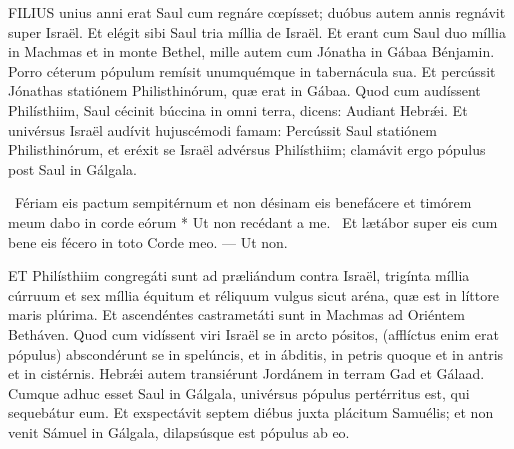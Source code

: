 




\lettrine[lines=2]{F}{ILIUS} unius anni erat Saul cum regnáre cœpísset; duóbus autem annis regnávit super Israël. Et elégit sibi Saul tria míllia de Israël. Et erant cum Saul duo míllia in Machmas et in monte Bethel, mille autem cum Jónatha in Gábaa Bénjamin. Porro céterum pópulum remísit unumquémque in tabernácula sua. Et percússit Jónathas statiónem Philisthinórum, quæ erat in Gábaa. Quod cum audíssent Philísthiim, Saul cécinit búccina in omni terra, dicens: Audiant Hebrǽi. Et univérsus Israël audívit hujuscémodi famam: Percússit Saul statiónem Philisthinórum, et eréxit se Israël advérsus Philísthiim; clamávit ergo pópulus post Saul in Gálgala.

\R\ Fériam eis pactum sempitérnum et non désinam eis benefácere et timórem meum dabo in corde eórum * Ut non recédant a me. \V\ Et lætábor super eis cum bene eis fécero in toto Corde meo. --- Ut non.


\lettrine[lines=2]{E}{T} Philísthiim congregáti sunt ad præliándum contra Israël, trigínta míllia cúrruum et sex míllia équitum et réliquum vulgus sicut aréna, quæ est in líttore maris plúrima. Et ascendéntes castrametáti sunt in Machmas ad Oriéntem Betháven. Quod cum vidíssent viri Israël se in arcto pósitos, (afflíctus enim erat pópulus) abscondérunt se in spelúncis, et in ábditis, in petris quoque et in antris et in cistérnis. Hebrǽi autem transiérunt Jordánem in terram Gad et Gálaad. Cumque adhuc esset Saul in Gálgala, univérsus pópulus pertérritus est, qui sequebátur eum. Et exspectávit septem diébus juxta plácitum Samuélis; et non venit Sámuel in Gálgala, dilapsúsque est pópulus ab eo.

